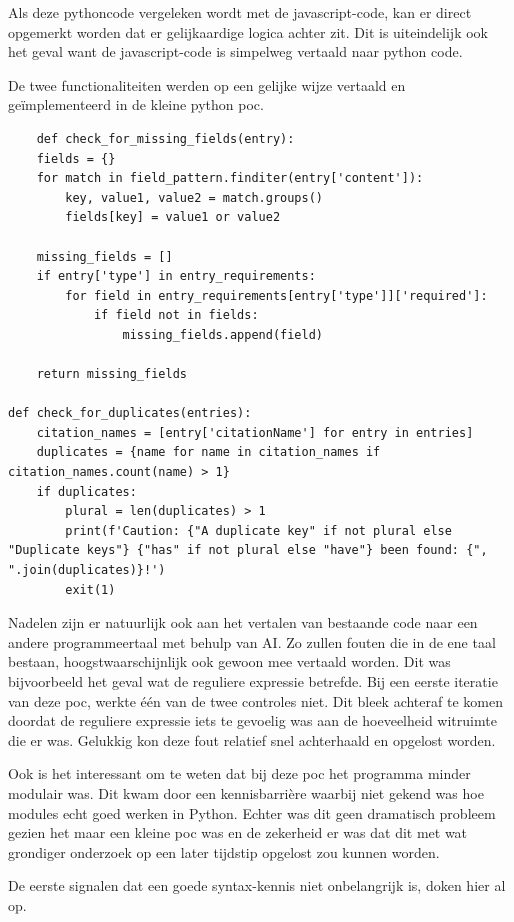 Als deze pythoncode vergeleken wordt met de javascript-code, kan er direct opgemerkt worden dat er gelijkaardige logica achter zit. Dit is uiteindelijk ook het geval want de javascript-code is simpelweg vertaald naar python code.

De twee functionaliteiten werden op een gelijke wijze vertaald en geïmplementeerd in de kleine python poc.

\begin{verbatim}
    def check_for_missing_fields(entry):
    fields = {}
    for match in field_pattern.finditer(entry['content']):
        key, value1, value2 = match.groups()
        fields[key] = value1 or value2

    missing_fields = []
    if entry['type'] in entry_requirements:
        for field in entry_requirements[entry['type']]['required']:
            if field not in fields:
                missing_fields.append(field)

    return missing_fields

def check_for_duplicates(entries):
    citation_names = [entry['citationName'] for entry in entries]
    duplicates = {name for name in citation_names if citation_names.count(name) > 1}
    if duplicates:
        plural = len(duplicates) > 1
        print(f'Caution: {"A duplicate key" if not plural else "Duplicate keys"} {"has" if not plural else "have"} been found: {", ".join(duplicates)}!')
        exit(1)
\end{verbatim}

Nadelen zijn er natuurlijk ook aan het vertalen van bestaande code naar een andere programmeertaal met behulp van AI. Zo zullen fouten die in de ene taal bestaan, hoogstwaarschijnlijk ook gewoon mee vertaald worden. Dit was bijvoorbeeld het geval wat de reguliere expressie betrefde. Bij een eerste iteratie van deze poc, werkte één van de twee controles niet. Dit bleek achteraf te komen doordat de reguliere expressie iets te gevoelig was aan de hoeveelheid witruimte die er was. Gelukkig kon deze fout relatief snel achterhaald en opgelost worden.

Ook is het interessant om te weten dat bij deze poc het programma minder modulair was. Dit kwam door een kennisbarrière waarbij niet gekend was hoe modules echt goed werken in Python. Echter was dit geen dramatisch probleem gezien het maar een kleine poc was en de zekerheid er was dat dit met wat grondiger onderzoek op een later tijdstip opgelost zou kunnen worden.

De eerste signalen dat een goede syntax-kennis niet onbelangrijk is, doken hier al op.

